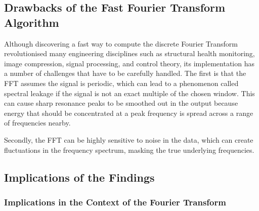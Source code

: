 \documentclass[12pt]{article}
\begin{document}
    \subsection{Drawbacks of the Fast Fourier Transform Algorithm}
    Although discovering a fast way to compute the discrete Fourier Transform revolutionised many engineering disciplines such as structural health monitoring, image compression, signal processing, and control theory\cite{Byjus2023}, its implementation has a number of challenges that have to be carefully handled.
    The first is that the FFT assumes the signal is periodic, which can lead to a phenomenon called spectral leakage if the signal is not an exact multiple of the chosen window\cite{MathStackExchange2023}.
    This can cause sharp resonance peaks to be smoothed out in the output because energy that should be concentrated at a peak frequency is spread across a range of frequencies nearby.

    Secondly, the FFT can be highly sensitive to noise in the data, which can create fluctuations in the frequency spectrum, masking the true underlying frequencies\cite{MathStackExchange2023}.



    \subsection{Implications of the Findings}

    \subsubsection{Implications in the Context of the Fourier Transform}
\end{document}
